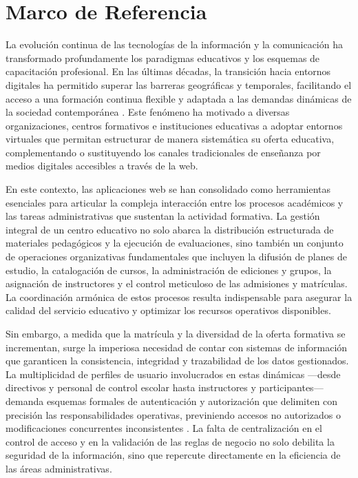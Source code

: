 \chapter{Marco de Referencia}

La evolución continua de las tecnologías de la información y la comunicación ha transformado profundamente los paradigmas educativos y los esquemas de capacitación profesional. En las últimas décadas, la transición hacia entornos digitales ha permitido superar las barreras geográficas y temporales, facilitando el acceso a una formación continua flexible y adaptada a las demandas dinámicas de la sociedad contemporánea \cite{unesco2023technology}. Este fenómeno ha motivado a diversas organizaciones, centros formativos e instituciones educativas a adoptar entornos virtuales que permitan estructurar de manera sistemática su oferta educativa, complementando o sustituyendo los canales tradicionales de enseñanza por medios digitales accesibles a través de la web.

En este contexto, las aplicaciones web se han consolidado como herramientas esenciales para articular la compleja interacción entre los procesos académicos y las tareas administrativas que sustentan la actividad formativa. La gestión integral de un centro educativo no solo abarca la distribución estructurada de materiales pedagógicos y la ejecución de evaluaciones, sino también un conjunto de operaciones organizativas fundamentales que incluyen la difusión de planes de estudio, la catalogación de cursos, la administración de ediciones y grupos, la asignación de instructores y el control meticuloso de las admisiones y matrículas. La coordinación armónica de estos procesos resulta indispensable para asegurar la calidad del servicio educativo y optimizar los recursos operativos disponibles.

Sin embargo, a medida que la matrícula y la diversidad de la oferta formativa se incrementan, surge la imperiosa necesidad de contar con sistemas de información que garanticen la consistencia, integridad y trazabilidad de los datos gestionados. La multiplicidad de perfiles de usuario involucrados en estas dinámicas —desde directivos y personal de control escolar hasta instructores y participantes— demanda esquemas formales de autenticación y autorización que delimiten con precisión las responsabilidades operativas, previniendo accesos no autorizados o modificaciones concurrentes inconsistentes \cite{sommerville2011software}. La falta de centralización en el control de acceso y en la validación de las reglas de negocio no solo debilita la seguridad de la información, sino que repercute directamente en la eficiencia de las áreas administrativas.

